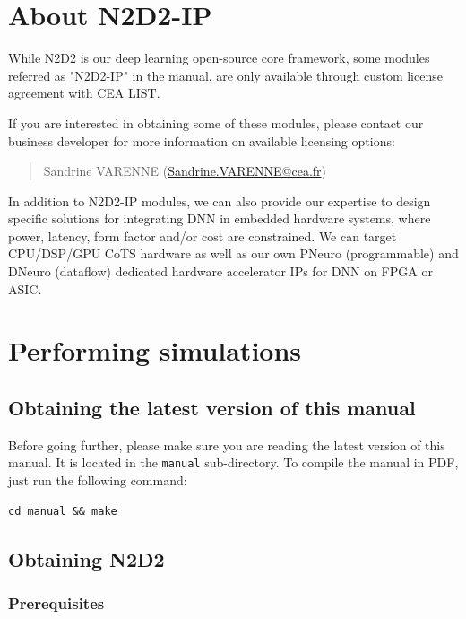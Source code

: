 \documentclass[a4paper,11pt,oneside]{article}
\begin{document}
\section{\label{sec:N2D2-IP}About N2D2-IP}

While N2D2 is our deep learning open-source core framework, some modules referred as "N2D2-IP" in the manual, are only available through custom license agreement with CEA LIST.

If you are interested in obtaining some of these modules, please contact our business developer for more information on available licensing options:

\begin{quote}
Sandrine VARENNE (\href{mailto:Sandrine.VARENNE@cea.fr?subject=[N2D2-IP inquiry]&body=I am interested in obtaining [...] N2D2-IP module(s).\%0A\%0A[please describe briefly the intended usage].\%0A\%0A[your affiliation and contact information].}{Sandrine.VARENNE@cea.fr})
\end{quote}

In addition to N2D2-IP modules, we can also provide our expertise to design specific solutions for integrating DNN in embedded hardware systems, where power, latency, form factor and/or cost are constrained. We can target CPU/DSP/GPU CoTS hardware as well as our own PNeuro (programmable) and DNeuro (dataflow) dedicated hardware accelerator IPs for DNN on FPGA or ASIC.

\section{Performing simulations}

\subsection{Obtaining the latest version of this manual}

Before going further, please make sure you are reading the latest version of
 this manual.
It is located in the {\tt{}manual} sub-directory. To compile the manual
in PDF, just run
the following command:
\begin{lstlisting}
cd manual && make
\end{lstlisting}

\subsection{Obtaining N2D2}

\subsubsection{Prerequisites}
\end{document}
